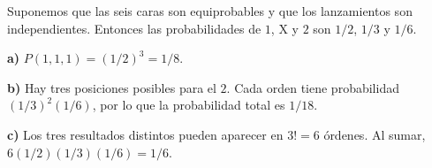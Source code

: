 Suponemos que las seis caras son equiprobables y que los lanzamientos son independientes. Entonces las probabilidades de $1$, $\mathrm X$ y $2$ son $1/2$, $1/3$ y $1/6$.

\textbf{a)} $P(1,1,1)=(1/2)^3=\boxed{1/8}$.

\textbf{b)} Hay tres posiciones posibles para el $2$. Cada orden tiene probabilidad $(1/3)^2(1/6)$, por lo que la probabilidad total es $\boxed{1/18}$.

\textbf{c)} Los tres resultados distintos pueden aparecer en $3!=6$ órdenes. Al sumar, $6(1/2)(1/3)(1/6)=\boxed{1/6}$.
